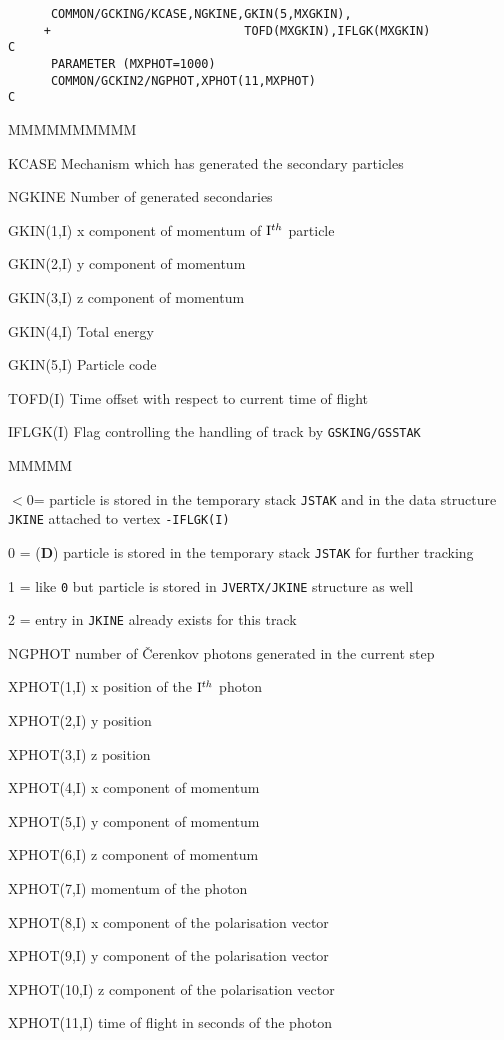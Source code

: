 \begin{verbatim}
      COMMON/GCKING/KCASE,NGKINE,GKIN(5,MXGKIN),
     +                           TOFD(MXGKIN),IFLGK(MXGKIN)
C
      PARAMETER (MXPHOT=1000)
      COMMON/GCKIN2/NGPHOT,XPHOT(11,MXPHOT)
C
\end{verbatim}
\begin{DLtt}{MMMMMMMMMM}
\item[KCASE] Mechanism which has generated the secondary particles
\item[NGKINE]Number of generated secondaries
\item[GKIN(1,I)]x component of momentum of ${\rm I}^{th}$ particle
\item[GKIN(2,I)]y component of momentum
\item[GKIN(3,I)]z component of momentum
\item[GKIN(4,I)]Total energy
\item[GKIN(5,I)]Particle code
\item[TOFD(I)]Time offset with respect to current time of flight
\item[IFLGK(I)]Flag controlling the handling of track by {\tt GSKING/GSSTAK}
\begin{DLtt}{MMMMM}
\item[$<0$=]particle is stored in  the temporary stack {\tt JSTAK} and in
the data structure {\tt JKINE} attached to vertex {\tt -IFLGK(I)}
\item[0 =]({\bf D}) particle is stored in the temporary stack {\tt JSTAK}
for further tracking
\item[1 =] like {\tt 0} but
particle is stored in {\tt JVERTX/JKINE} structure as well
\item[2 =] entry in {\tt JKINE} already exists for this track
\end{DLtt}
\item[NGPHOT] number of \v{C}erenkov photons generated in the current
step
\item[XPHOT(1,I)] x position of the ${\rm I}^{th}$ photon
\item[XPHOT(2,I)] y position
\item[XPHOT(3,I)] z position
\item[XPHOT(4,I)] x component of momentum
\item[XPHOT(5,I)] y component of momentum
\item[XPHOT(6,I)] z component of momentum
\item[XPHOT(7,I)] momentum of the photon
\item[XPHOT(8,I)] x component of the polarisation vector
\item[XPHOT(9,I)] y component of the polarisation vector
\item[XPHOT(10,I)] z component of the polarisation vector
\item[XPHOT(11,I)] time of flight in seconds of the photon
\end{DLtt}
